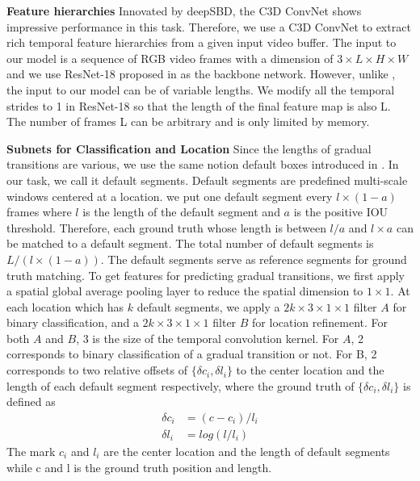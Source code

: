 \documentclass[runningheads]{llncs}
\begin{document}
\textbf{Feature hierarchies} Innovated by deepSBD, the C3D ConvNet shows impressive performance in this task. Therefore, we use a C3D ConvNet to extract rich temporal feature hierarchies from a given input video buffer. The input to our model is a sequence of RGB video frames with a dimension of \(3\times L\times H\times W\) and we use ResNet-18 proposed in \cite{hara3dcnns} as the backbone network. However, unlike \cite{hara3dcnns}, the input to our model can be of variable lengths. We modify all the temporal strides to 1 in ResNet-18 so that the length of the final feature map is also L. The number of frames L can be arbitrary and is only limited by memory.

\textbf{Subnets for Classification and Location} Since the lengths of gradual transitions are various, we use the same notion default boxes introduced in \cite{liu2016ssd}. In our task, we call it default segments. Default segments are predefined multi-scale windows centered at a location. we put one default segment every \(l\times (1-a)\) frames where \(l\) is the length of the default segment and \(a\) is the positive IOU threshold. Therefore, each ground truth whose length is between \(l/a\) and \(l\times a\) can be matched to a default segment. The total number of default segments is \(L/(l\times(1-a))\). The default segments serve as reference segments for ground truth matching. To get features for predicting gradual transitions, we first apply a spatial global average pooling layer to reduce the spatial dimension to \(1\times1\).  At each location which has \(k\) default segments, we apply a \(2k\times3\times1\times1\) filter \(A\) for binary classification, and a \(2k\times3\times1\times1\) filter \(B\) for location refinement. For both \(A\) and \(B\), 3 is the size of the temporal convolution kernel. For \(A\), 2 corresponds to binary classification of a gradual transition or not. For B, 2 corresponds to two relative offsets of \(\{\delta c_i ,\delta l_i\}\) to the center location and the length of each default segment respectively, where the ground truth of \(\{\delta c_i ,\delta l_i\}\) is defined as
\begin{align}
\delta c_i&=(c-c_i)/l_i \\
\delta l_i&=log(l/l_i)
\end{align}
The mark \(c_i\) and \(l_i\) are the center location and the length of default segments while c and l is the ground truth position and length.
\end{document}
